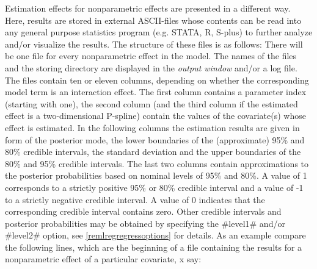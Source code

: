 Estimation effects for nonparametric effects are presented in a
different way. Here, results are stored in external ASCII-files
whose contents can be read into any general purpose statistics
program (e.g. STATA, R, S-plus) to further analyze and/or
visualize the results. The structure of these files is as follows:
There will be one file for every nonparametric effect in the
model. The names of the files and the storing directory are
displayed in the {\em output window} and/or a log file. The files
contain ten or eleven columns, depending on whether the
corresponding model term is an interaction effect. The first
column contains a parameter index (starting with one), the second
column (and the third column if the estimated effect is a
two-dimensional P-spline) contain the values of the covariate(s)
whose effect is estimated. In the following columns the estimation
results are given in form of the posterior mode, the lower
boundaries of the (approximate) 95\% and 80\% credible intervals,
the standard deviation and the upper boundaries of the 80\% and
95\% credible intervals. The last two columns contain
approximations to the posterior probabilities based on nominal
levels of 95\% and 80\%. A value of 1 corresponds to a strictly
positive 95\% or 80\% credible interval and a value of -1 to a
strictly negative credible interval. A value of 0 indicates that
the corresponding credible interval contains zero. Other credible
intervals and posterior probabilities may be obtained by
specifying the #level1# and/or #level2# option, see
\autoref{remlregregressoptions} for details. As an example compare
the following lines, which are the beginning of a file containing
the results for a nonparametric effect of a particular covariate,
x say:

